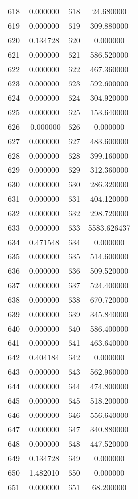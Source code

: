 \documentclass[12pt]{article}
\begin{document}
\begin{longtable}{@{}cccc@{}}
618 & 0.000000 & 618 & 24.680000 \\
619 & 0.000000 & 619 & 309.880000 \\
620 & 0.134728 & 620 & 0.000000 \\
621 & 0.000000 & 621 & 586.520000 \\
622 & 0.000000 & 622 & 467.360000 \\
623 & 0.000000 & 623 & 592.600000 \\
624 & 0.000000 & 624 & 304.920000 \\
625 & 0.000000 & 625 & 153.640000 \\
626 & -0.000000 & 626 & 0.000000 \\
627 & 0.000000 & 627 & 483.600000 \\
628 & 0.000000 & 628 & 399.160000 \\
629 & 0.000000 & 629 & 312.360000 \\
630 & 0.000000 & 630 & 286.320000 \\
631 & 0.000000 & 631 & 404.120000 \\
632 & 0.000000 & 632 & 298.720000 \\
633 & 0.000000 & 633 & 5583.626437 \\
634 & 0.471548 & 634 & 0.000000 \\
635 & 0.000000 & 635 & 514.600000 \\
636 & 0.000000 & 636 & 509.520000 \\
637 & 0.000000 & 637 & 524.400000 \\
638 & 0.000000 & 638 & 670.720000 \\
639 & 0.000000 & 639 & 345.840000 \\
640 & 0.000000 & 640 & 586.400000 \\
641 & 0.000000 & 641 & 463.640000 \\
642 & 0.404184 & 642 & 0.000000 \\
643 & 0.000000 & 643 & 562.960000 \\
644 & 0.000000 & 644 & 474.800000 \\
645 & 0.000000 & 645 & 518.200000 \\
646 & 0.000000 & 646 & 556.640000 \\
647 & 0.000000 & 647 & 340.880000 \\
648 & 0.000000 & 648 & 447.520000 \\
649 & 0.134728 & 649 & 0.000000 \\
650 & 1.482010 & 650 & 0.000000 \\
651 & 0.000000 & 651 & 68.200000 \\

\end{longtable}
\end{document}

